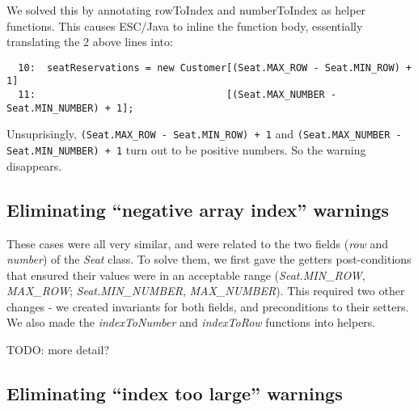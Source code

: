 \documentclass{article}
\begin{document}
We solved this by annotating rowToIndex and numberToIndex as helper functions. This causes ESC/Java to inline the function body, essentially translating the 2 above lines into:

\begin{verbatim}
  10:  seatReservations = new Customer[(Seat.MAX_ROW - Seat.MIN_ROW) + 1]
  11:                                 [(Seat.MAX_NUMBER - Seat.MIN_NUMBER) + 1];
\end{verbatim}

Unsuprisingly, \verb|(Seat.MAX_ROW - Seat.MIN_ROW) + 1| and \verb|(Seat.MAX_NUMBER - Seat.MIN_NUMBER) + 1| turn out to be positive numbers. So the warning disappears.

\subsection{Eliminating ``negative array index'' warnings}

These cases were all very similar, and were related to the two fields (\emph{row} and \emph{number}) of the \emph{Seat} class. To solve them, we first gave the getters post-conditions that ensured their values were in an acceptable range (\emph{Seat.MIN\_ROW}, \emph{MAX\_ROW}; \emph{Seat.MIN\_NUMBER}, \emph{MAX\_NUMBER}). This required two other changes - we created invariants for both fields, and preconditions to their setters. We also made the \emph{indexToNumber} and \emph{indexToRow} functions into helpers.

TODO: more detail?

\subsection{Eliminating ``index too large'' warnings}
\end{document}
